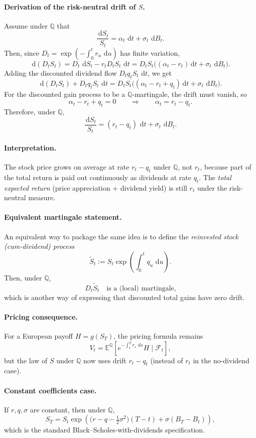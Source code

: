 \documentclass[11pt]{article}
\newcommand{\Qbb}{\mathbb{Q}}
\newcommand{\E}{\mathbb{E}}
\newcommand{\dd}{\,\mathrm{d}}
\newcommand{\1}{\mathbf{1}}
\begin{document}
\paragraph{Derivation of the risk-neutral drift of \(S\).}
Assume under \(\Qbb\) that
$$
\frac{\dd S_t}{S_t}=\alpha_t\,\dd t+\sigma_t\,\dd B_t.
$$
Then, since \(D_t=\exp(-\int_0^t r_u\,\dd u)\) has finite variation,
$$
\dd(D_tS_t)=D_t\,\dd S_t-r_tD_tS_t\,\dd t
= D_tS_t\big((\alpha_t-r_t)\dd t+\sigma_t\,\dd B_t\big).
$$
Adding the discounted dividend flow \(D_t q_t S_t\,\dd t\), we get
$$
\dd(D_tS_t)+D_t q_t S_t\,\dd t
=
D_tS_t\big((\alpha_t-r_t+q_t)\dd t+\sigma_t\,\dd B_t\big).
$$
For the discounted gain process to be a \(\Qbb\)-martingale, the drift must vanish, so
$$
\alpha_t-r_t+q_t=0
\qquad\Longrightarrow\qquad
\alpha_t=r_t-q_t.
$$
Therefore, under \(\Qbb\),
$$
\boxed{\ \frac{\dd S_t}{S_t}=(r_t-q_t)\,\dd t+\sigma_t\,\dd B_t.\ }
$$

\paragraph{Interpretation.}
The stock price grows on average at rate \(r_t-q_t\) under \(\Qbb\), not \(r_t\), because part of the total return is paid out continuously as dividends at rate \(q_t\).
The \emph{total expected return} (price appreciation + dividend yield) is still \(r_t\) under the risk-neutral measure.

\paragraph{Equivalent martingale statement.}
An equivalent way to package the same idea is to define the \emph{reinvested stock (cum-dividend) process}
$$
\widetilde S_t
:= S_t \exp\!\left(\int_0^t q_u\,\dd u\right).
$$
Then, under \(\Qbb\),
$$
D_t\widetilde S_t
\quad\text{is a (local) martingale,}
$$
which is another way of expressing that discounted total gains have zero drift.

\paragraph{Pricing consequence.}
For a European payoff \(H=g(S_T)\), the pricing formula remains
$$
V_t=\E^{\Qbb}\!\left[e^{-\int_t^T r_s\,\dd s}H\mid \mathcal F_t\right],
$$
but the law of \(S\) under \(\Qbb\) now uses drift \(r_t-q_t\) (instead of \(r_t\) in the no-dividend case).

\paragraph{Constant coefficients case.}
If \(r,q,\sigma\) are constant, then under \(\Qbb\),
$$
S_T=S_t\exp\!\left(\Big(r-q-\tfrac12\sigma^2\Big)(T-t)+\sigma(B_T-B_t)\right),
$$
which is the standard Black--Scholes-with-dividends specification.
\end{document}
